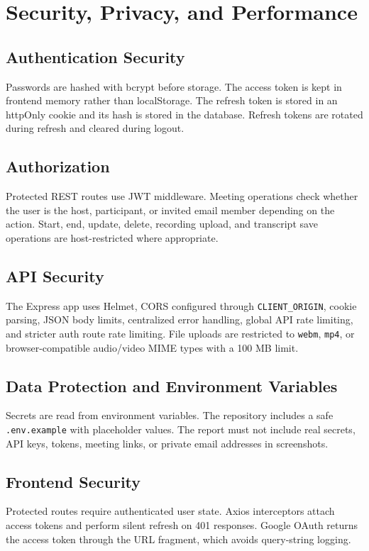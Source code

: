 \documentclass[11pt,a4paper]{article}
\begin{document}
\newpage

\section{Security, Privacy, and Performance}
\subsection{Authentication Security}
Passwords are hashed with bcrypt before storage. The access token is kept in frontend memory rather than localStorage. The refresh token is stored in an httpOnly cookie and its hash is stored in the database. Refresh tokens are rotated during refresh and cleared during logout.

\subsection{Authorization}
Protected REST routes use JWT middleware. Meeting operations check whether the user is the host, participant, or invited email member depending on the action. Start, end, update, delete, recording upload, and transcript save operations are host-restricted where appropriate.

\subsection{API Security}
The Express app uses Helmet, CORS configured through \texttt{CLIENT\_ORIGIN}, cookie parsing, JSON body limits, centralized error handling, global API rate limiting, and stricter auth route rate limiting. File uploads are restricted to \texttt{webm}, \texttt{mp4}, or browser-compatible audio/video MIME types with a 100 MB limit.

\subsection{Data Protection and Environment Variables}
Secrets are read from environment variables. The repository includes a safe \texttt{.env.example} with placeholder values. The report must not include real secrets, API keys, tokens, meeting links, or private email addresses in screenshots.

\subsection{Frontend Security}
Protected routes require authenticated user state. Axios interceptors attach access tokens and perform silent refresh on 401 responses. Google OAuth returns the access token through the URL fragment, which avoids query-string logging.
\end{document}
